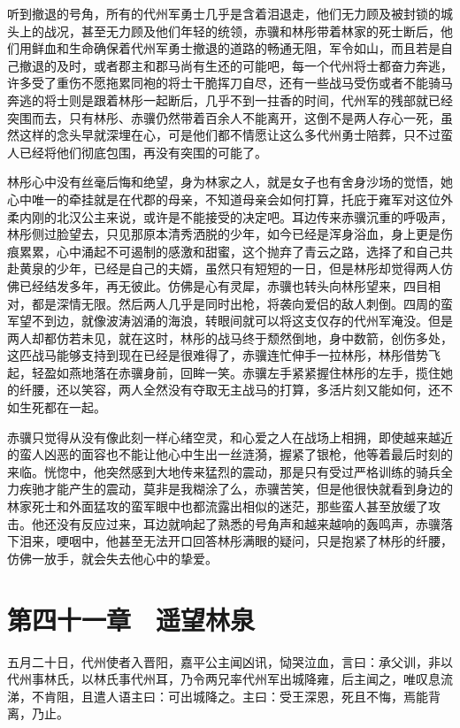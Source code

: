 听到撤退的号角，所有的代州军勇士几乎是含着泪退走，他们无力顾及被封锁的城头上的战况，甚至无力顾及他们年轻的统领，赤骥和林彤带着林家的死士断后，他们用鲜血和生命确保着代州军勇士撤退的道路的畅通无阻，军令如山，而且若是自己撤退的及时，或者郡主和郡马尚有生还的可能吧，每一个代州将士都奋力奔逃，许多受了重伤不愿拖累同袍的将士干脆挥刀自尽，还有一些战马受伤或者不能骑马奔逃的将士则是跟着林彤一起断后，几乎不到一拄香的时间，代州军的残部就已经突围而去，只有林彤、赤骥仍然带着百余人不能离开，这倒不是两人存心一死，虽然这样的念头早就深埋在心，可是他们都不情愿让这么多代州勇士陪葬，只不过蛮人已经将他们彻底包围，再没有突围的可能了。

林彤心中没有丝毫后悔和绝望，身为林家之人，就是女子也有舍身沙场的觉悟，她心中唯一的牵挂就是在代郡的母亲，不知道母亲会如何打算，托庇于雍军对这位外柔内刚的北汉公主来说，或许是不能接受的决定吧。耳边传来赤骥沉重的呼吸声，林彤侧过脸望去，只见那原本清秀洒脱的少年，如今已经是浑身浴血，身上更是伤痕累累，心中涌起不可遏制的感激和甜蜜，这个抛弃了青云之路，选择了和自己共赴黄泉的少年，已经是自己的夫婿，虽然只有短短的一日，但是林彤却觉得两人仿佛已经结发多年，再无彼此。仿佛是心有灵犀，赤骥也转头向林彤望来，四目相对，都是深情无限。然后两人几乎是同时出枪，将袭向爱侣的敌人刺倒。四周的蛮军望不到边，就像波涛汹涌的海浪，转眼间就可以将这支仅存的代州军淹没。但是两人却都仿若未见，就在这时，林彤的战马终于颓然倒地，身中数箭，创伤多处，这匹战马能够支持到现在已经是很难得了，赤骥连忙伸手一拉林彤，林彤借势飞起，轻盈如燕地落在赤骥身前，回眸一笑。赤骥左手紧紧握住林彤的左手，揽住她的纤腰，还以笑容，两人全然没有夺取无主战马的打算，多活片刻又能如何，还不如生死都在一起。

赤骥只觉得从没有像此刻一样心绪空灵，和心爱之人在战场上相拥，即使越来越近的蛮人凶恶的面容也不能让他心中生出一丝涟漪，握紧了银枪，他等着最后时刻的来临。恍惚中，他突然感到大地传来猛烈的震动，那是只有受过严格训练的骑兵全力疾驰才能产生的震动，莫非是我糊涂了么，赤骥苦笑，但是他很快就看到身边的林家死士和外面猛攻的蛮军眼中也都流露出相似的迷茫，那些蛮人甚至放缓了攻击。他还没有反应过来，耳边就响起了熟悉的号角声和越来越响的轰鸣声，赤骥落下泪来，哽咽中，他甚至无法开口回答林彤满眼的疑问，只是抱紧了林彤的纤腰，仿佛一放手，就会失去他心中的挚爱。

\chapter{第四十一章　遥望林泉}

五月二十日，代州使者入晋阳，嘉平公主闻凶讯，恸哭泣血，言曰：承父训，非以代州事林氏，以林氏事代州耳，乃令两兄率代州军出城降雍，后主闻之，唯叹息流涕，不肯阻，且遣人语主曰：可出城降之。主曰：受王深恩，死且不悔，焉能背离，乃止。

